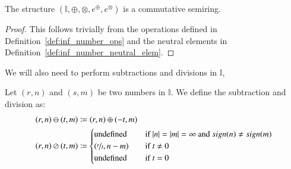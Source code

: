 \begin{lemma}
The structure $(\mathbb{I}, \oplus, \otimes, e^\oplus , e^\otimes )$ is a commutative semiring.
\end{lemma}
\begin{proof}
This follows trivially from the operations defined in Definition~\ref{def:inf_number_ops} and the neutral elements in Definition~\ref{def:inf_number_neutral_elem}.
\end{proof}
We will also need to perform subtractions and divisions in $\mathbb{I}$,


\begin{definition}
    \label{def:subdiv}
    Let $(r, n)$ and $(s,m)$ be two numbers in $\mathbb{I}$. We define the subtraction and division as:
    \begin{align}
            (r,n) \ominus (t,m) &\coloneqq  (r,n) \oplus (-t,m) \\
            (r,n) \oslash (t,m) &\coloneqq 
            \begin{cases}
                \text{undefined} &\quad \text{if $|n|=|m|=\infty$ and $sign(n) \neq sign(m)$} \\
                (\nicefrac{r}{t}, n-m)  &\quad \text{if $t\neq 0$} \\
                \text{undefined} &\quad \text{if $t=0$}
            \end{cases}
    \end{align}

\end{definition}

